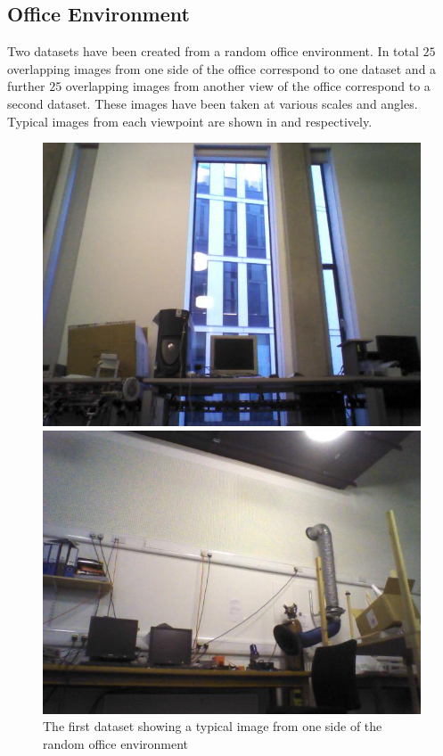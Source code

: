 \documentclass[11pt]{report}
\begin{document}
\subsection{Office Environment}
\label{sec:office}
Two datasets have been created from a random office environment. In total $25$ overlapping images from one side of the office correspond to one dataset and a further $25$ overlapping images from another view of the office correspond to a second dataset. These images have been taken at various scales and angles. Typical images from each viewpoint are shown in  and  respectively.\\


\begin{figure}[h!]
\begin{minipage}[b]{0.5\linewidth}
\includegraphics[scale=0.5]{../Drawings/datasetImages/dataset5.jpg}
\caption{The first dataset showing a typical image from one side of the random office environment}
\label{fig:dataset5}
\end{minipage}
\hspace{0.5cm}
\begin{minipage}[b]{0.5\linewidth}
\includegraphics[scale=0.5]{../Drawings/datasetImages/dataset6.jpg}

\end{minipage}
\end{figure}
\end{document}
